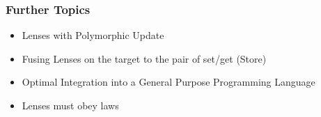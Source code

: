\begin{frame}
\frametitle{Further Topics}

\begin{itemize}
\item Lenses with Polymorphic Update
\item Fusing Lenses on the target to the pair of set/get (Store)
\item Optimal Integration into a General Purpose Programming Language
\item Lenses must obey laws
\end{itemize}

\end{frame}

